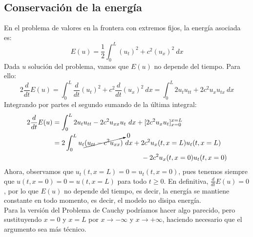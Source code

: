 \subsection{Conservación de la energía}
\noindent
En el problema de valores en la frontera con extremos fijos, la energía asociada es:
\begin{equation*}
    E(u) = \frac{1}{2}\int_{0}^{L} {(u_t)}^{2}+c^2{(u_x)}^{2}~dx 
\end{equation*}
Dada $u$ solución del problema, vamos que $E(u)$ no depende del tiempo. Para ello:
\begin{equation*}
    2\frac{d}{dt}E(u) = \int_{0}^{L} \frac{d}{dt}{(u_t)}^{2}+c^2 \frac{d}{dt}{(u_x)}^{2}~dx  = \int_{0}^{L} 2u_tu_{tt} + 2c^2u_xu_{tx}~dx 
\end{equation*}
Integrando por partes el segundo sumando de la última integral:
\begin{align*}
    2\frac{d}{dt}E(u) &= \int_{0}^{L} 2u_tu_{tt} - 2c^2u_{xx}u_t~dx + [2c^2u_xu_t]_{x=0}^{x=L} \\
                      &= 2\int_{0}^{L} u_t\cancelto{0}{(u_{tt}-c^2u_{xx})}~dx + 2c^2 u_x(t,x=L)u_t(t,x=L) \\ &\qquad \qquad \qquad \qquad \qquad \qquad\quad  - 2c^2 u_x(t,x=0)u_t(t,x=0)
\end{align*}
Ahora, observamos que $u_t(t,x=L) = 0 = u_t(t,x=0)$, pues tenemos siempre que $u(t,x=0) = 0 = u(t,x=L)$ para todo $t\geq 0$. En definitiva, $\frac{d}{dt}E(u) = 0$, por lo que $E(u)$ no depende del tiempo, es decir, la energía se mantiene constante en todo momento, es decir, el modelo no disipa energía.\\

\noindent
Para la versión del Problema de Cauchy podríamos hacer algo parecido, pero sustituyendo $x=0$ y $x=L$ por $x\to -\infty$ y $x\to +\infty$, haciendo necesario que el argumento sea más técnico.

